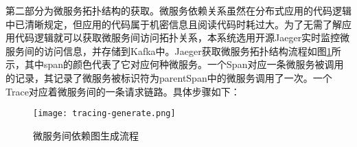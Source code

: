 
第二部分为微服务拓扑结构的获取。微服务依赖关系虽然在分布式应用的代码逻辑中已清晰规定，但应用的代码属于机密信息且阅读代码时耗过大。为了无需了解应用代码逻辑就可以获取微服务间访问拓扑关系，本系统选用开源Jaeger实时监控微服务间的访问信息，并存储到Kafka中。Jaeger获取微服务拓扑结构流程如图\ref{tracing-generate}所示，其中span的颜色代表了它对应何种微服务。一个Span对应一条微服务被调用的记录，其记录了微服务被标识符为parentSpan中的微服务调用了一次。一个Trace对应着微服务间的一条请求链路。具体步骤如下：


\begin{figure}[htbp]
    \centering
    \texttt{[image: tracing-generate.png]}
    \caption{微服务间依赖图生成流程\label{tracing-generate}}
\end{figure}

